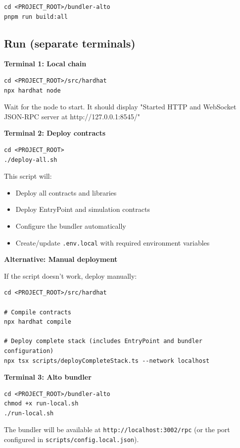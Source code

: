 \begin{verbatim}
cd <PROJECT_ROOT>/bundler-alto
pnpm run build:all
\end{verbatim}

\subsection{Run (separate terminals)}

\textbf{Terminal 1: Local chain}

\begin{verbatim}
cd <PROJECT_ROOT>/src/hardhat
npx hardhat node
\end{verbatim}

Wait for the node to start. It should display "Started HTTP and WebSocket JSON-RPC server at http://127.0.0.1:8545/"

\textbf{Terminal 2: Deploy contracts}

\begin{verbatim}
cd <PROJECT_ROOT>
./deploy-all.sh
\end{verbatim}

This script will:
\begin{itemize}
  \item Deploy all contracts and libraries
  \item Deploy EntryPoint and simulation contracts
  \item Configure the bundler automatically
  \item Create/update \texttt{.env.local} with required environment variables
\end{itemize}

\textbf{Alternative: Manual deployment}

If the script doesn't work, deploy manually:

\begin{verbatim}
cd <PROJECT_ROOT>/src/hardhat

# Compile contracts
npx hardhat compile

# Deploy complete stack (includes EntryPoint and bundler configuration)
npx tsx scripts/deployCompleteStack.ts --network localhost
\end{verbatim}

\textbf{Terminal 3: Alto bundler}

\begin{verbatim}
cd <PROJECT_ROOT>/bundler-alto
chmod +x run-local.sh
./run-local.sh
\end{verbatim}

The bundler will be available at \texttt{http://localhost:3002/rpc} (or the port configured in \texttt{scripts/config.local.json}).

